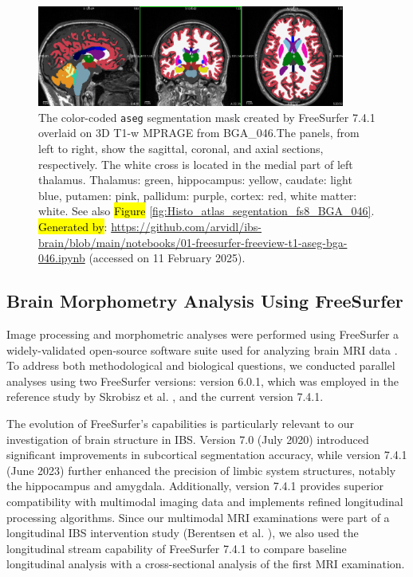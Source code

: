 \documentclass[diagnostics,article,accept,pdftex,moreauthors]{Definitions/mdpi}
\begin{document}
\begin{figure}[H]
\includegraphics[width=0.9\textwidth]{figs/ASEG_Native_cross_in_Left_Thalamus_BGA_046.png}
\caption{{{The color-coded \texttt{aseg} segmentation mask created by FreeSurfer 7.4.1 overlaid on 3D T1-w MPRAGE from BGA\_04}6}.{The panels, from left to right,} 
show the sagittal, coronal, and axial sections, respectively. The white cross is located in the medial part of left thalamus. Thalamus: green, hippocampus: yellow, caudate: light blue, putamen: pink, pallidum: purple, cortex: red, white matter: white. See also \hl{Figure} %
 \ref{fig:Histo_atlas_segentation_fs8_BGA_046}.
{\hl{Generated by}: {{\url{https://github.com/arvidl/ibs-brain/blob/main/notebooks/01-freesurfer-freeview-t1-aseg-bga-046.ipynb}}}} (accessed on 11 February 2025).}
\label{fig:ASEG_Native_cross_in_Left_Thalamus_BGA_046}
\end{figure}


\subsection{Brain Morphometry Analysis Using FreeSurfer}

Image processing and morphometric analyses were performed using {FreeSurfer}
a widely-validated open-source software suite used for analyzing brain MRI data \cite{Fischl2012}. To address both methodological and biological questions, we conducted parallel analyses using two FreeSurfer versions: version 6.0.1, which was employed in the reference study by Skrobisz et al. \cite{Skrobisz2022}, and the current version 7.4.1.

The evolution of FreeSurfer's capabilities is particularly relevant to our investigation of brain structure in IBS. Version 7.0 (July 2020) introduced significant improvements in subcortical segmentation accuracy, while version 7.4.1 (June 2023) further enhanced the precision of limbic system structures, notably the hippocampus and amygdala. Additionally, version 7.4.1 provides superior compatibility with multimodal imaging data and implements refined longitudinal processing algorithms. Since our multimodal MRI examinations were part of a longitudinal IBS intervention study (Berentsen et al. \cite{berentsen2020study}), we also used the longitudinal stream capability of FreeSurfer 7.4.1 to compare baseline longitudinal analysis with a cross-sectional analysis of the first MRI examination. 
\end{document}
